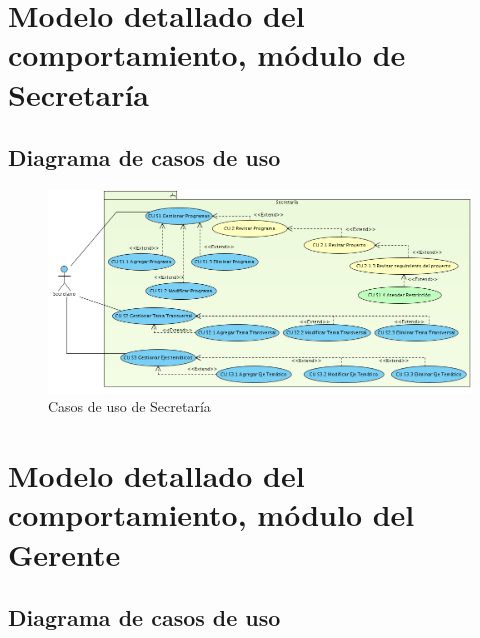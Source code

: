 \documentclass[10pt]{book}
\begin{document}

\chapter{Modelo detallado del comportamiento, módulo de Secretaría} 

\section{Diagrama de casos de uso}

\begin{figure}[htbp!]
	\begin{center}
		\includegraphics[width=\textwidth]{images/CUsecretaria}
		\caption{Casos de uso de Secretaría}
		\label{fig:default}
	\end{center}
\end{figure}



\chapter{Modelo detallado del comportamiento, módulo del Gerente} 
\section{Diagrama de casos de uso}
\end{document}
